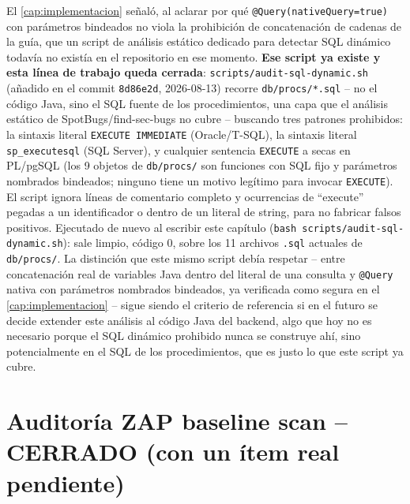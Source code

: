 El \autoref{cap:implementacion} señaló, al aclarar por qué
\texttt{@Query(nativeQuery=true)} con parámetros bindeados no viola la
prohibición de concatenación de cadenas de la guía, que un script de
análisis estático dedicado para detectar SQL dinámico todavía no existía
en el repositorio en ese momento. \textbf{Ese script ya existe y esta
línea de trabajo queda cerrada}: \texttt{scripts/audit-sql-dynamic.sh}
(añadido en el commit \texttt{8d86e2d}, 2026-08-13) recorre
\texttt{db/procs/*.sql} -- no el código Java, sino el SQL fuente de los
procedimientos, una capa que el análisis estático de SpotBugs/find-sec-bugs
no cubre -- buscando tres patrones prohibidos: la sintaxis literal
\texttt{EXECUTE IMMEDIATE} (Oracle/T-SQL), la sintaxis literal
\texttt{sp\_executesql} (SQL Server), y cualquier sentencia \texttt{EXECUTE}
a secas en PL/pgSQL (los 9 objetos de \texttt{db/procs/} son funciones con
SQL fijo y parámetros nombrados bindeados; ninguno tiene un motivo
legítimo para invocar \texttt{EXECUTE}). El script ignora líneas de
comentario completo y ocurrencias de ``execute'' pegadas a un
identificador o dentro de un literal de string, para no fabricar falsos
positivos. Ejecutado de nuevo al escribir este capítulo
(\texttt{bash scripts/audit-sql-dynamic.sh}): sale limpio, código 0,
sobre los 11 archivos \texttt{.sql} actuales de \texttt{db/procs/}. La
distinción que este mismo script debía respetar -- entre concatenación
real de variables Java dentro del literal de una consulta y
\texttt{@Query} nativa con parámetros nombrados bindeados, ya verificada
como segura en el \autoref{cap:implementacion} -- sigue siendo el
criterio de referencia si en el futuro se decide extender este análisis
al código Java del backend, algo que hoy no es necesario porque el SQL
dinámico prohibido nunca se construye ahí, sino potencialmente en el SQL
de los procedimientos, que es justo lo que este script ya cubre.

\section{Auditoría ZAP baseline scan -- CERRADO (con un ítem real pendiente)}
\label{sec:tf-zap}

